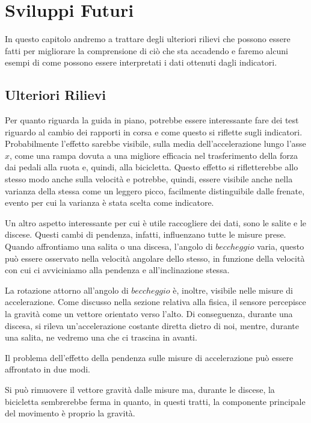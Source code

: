 \documentclass[12pt, a4paper]{article}
\begin{document}
	\justifying	
	\section{Sviluppi Futuri}
	In questo capitolo andremo a trattare degli ulteriori rilievi che possono essere fatti per migliorare la comprensione di ciò che sta accadendo e faremo alcuni esempi di come possono essere interpretati i dati ottenuti dagli indicatori.
	
	\subsection{Ulteriori Rilievi}
	Per quanto riguarda la guida in piano, potrebbe essere interessante fare dei test riguardo al cambio dei rapporti in corsa e come questo si riflette sugli indicatori. Probabilmente l'effetto sarebbe visibile, sulla media dell'accelerazione lungo l'asse \(x\), come una rampa dovuta a una migliore efficacia nel trasferimento della forza dai pedali alla ruota e, quindi, alla bicicletta. Questo effetto si rifletterebbe allo stesso modo anche sulla velocità e potrebbe, quindi, essere visibile anche nella varianza della stessa come un leggero picco, facilmente distinguibile dalle frenate, evento per cui la varianza è stata scelta come indicatore.\hfill\break
	
	Un altro aspetto interessante per cui è utile raccogliere dei dati, sono le salite e le discese.  Questi cambi di pendenza, infatti, influenzano tutte le misure prese. Quando affrontiamo una salita o una discesa, l'angolo di \(beccheggio\) varia, questo può essere osservato nella velocità angolare dello stesso, in funzione della velocità con cui ci avviciniamo alla pendenza e all'inclinazione stessa.
	
	La rotazione attorno all'angolo di \(beccheggio\) è, inoltre, visibile nelle misure di accelerazione. Come discusso nella sezione relativa alla fisica, il sensore percepisce la gravità come un vettore orientato verso l'alto. Di conseguenza, durante una discesa, si rileva un'accelerazione costante diretta dietro di noi, mentre, durante una salita, ne vedremo una che ci trascina in avanti.
	
	Il problema dell'effetto della pendenza sulle misure di accelerazione può essere affrontato in due modi.
	
	Si può rimuovere il vettore gravità dalle misure ma, durante le discese, la bicicletta sembrerebbe ferma in quanto, in questi tratti, la componente principale del movimento è proprio la gravità.
	
\end{document}
